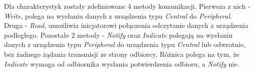 Dla charakterystyk zostały zdefiniowane 4 metody komunikacji. Pierwsza z nich - \textit{Write}, polega na wysłaniu danych z urządzenia typu \textit{Central} do \textit{Peripheral}. Druga - \textit{Read}, umożliwia inicjatorowi połączenia odczytanie danych z urządzenia podległego. Pozostałe 2 metody - \textit{Notify} oraz \textit{Indicate} polegają na wysłaniu danych z urządzenia typu \textit{Peripheral} do urządzenia typu \textit{Central} lub odwrotnie, bez żadnego żądania transmisji ze strony odbiorcy. Różnica polega na tym, że \textit{Indicate} wymaga od odbiornika wysłania potwierdzenia odbioru, a \textit{Notify} nie.

